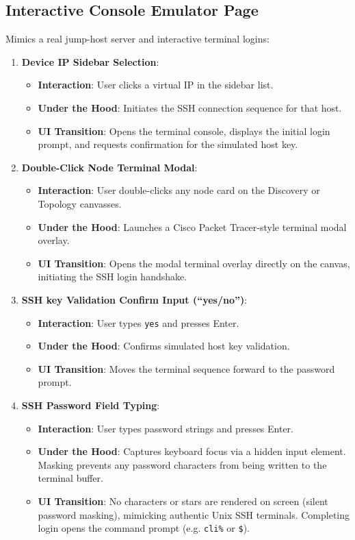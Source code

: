 \documentclass[11pt,a4paper]{article}
\begin{document}
\subsection{Interactive Console Emulator Page}
Mimics a real jump-host server and interactive terminal logins:
\begin{enumerate}
    \item \textbf{Device IP Sidebar Selection}:
    \begin{itemize}
        \item \textbf{Interaction}: User clicks a virtual IP in the sidebar list.
        \item \textbf{Under the Hood}: Initiates the SSH connection sequence for that host.
        \item \textbf{UI Transition}: Opens the terminal console, displays the initial login prompt, and requests confirmation for the simulated host key.
    \end{itemize}
    
    \item \textbf{Double-Click Node Terminal Modal}:
    \begin{itemize}
        \item \textbf{Interaction}: User double-clicks any node card on the Discovery or Topology canvasses.
        \item \textbf{Under the Hood}: Launches a Cisco Packet Tracer-style terminal modal overlay.
        \item \textbf{UI Transition}: Opens the modal terminal overlay directly on the canvas, initiating the SSH login handshake.
    \end{itemize}
    
    \item \textbf{SSH key Validation Confirm Input (``yes/no'')}:
    \begin{itemize}
        \item \textbf{Interaction}: User types \texttt{yes} and presses Enter.
        \item \textbf{Under the Hood}: Confirms simulated host key validation.
        \item \textbf{UI Transition}: Moves the terminal sequence forward to the password prompt.
    \end{itemize}
    
    \item \textbf{SSH Password Field Typing}:
    \begin{itemize}
        \item \textbf{Interaction}: User types password strings and presses Enter.
        \item \textbf{Under the Hood}: Captures keyboard focus via a hidden input element. Masking prevents any password characters from being written to the terminal buffer.
        \item \textbf{UI Transition}: No characters or stars are rendered on screen (silent password masking), mimicking authentic Unix SSH terminals. Completing login opens the command prompt (e.g. \texttt{cli\%} or \texttt{\$}).
    \end{itemize}
    

\end{enumerate}
\end{document}
